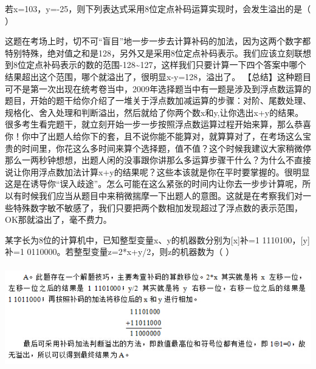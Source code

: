 \question 若x=103，y=-25，则下列表达式采用8位定点补码运算实现时，会发生溢出的是（
）
\par{}
\begin{solution}这题在考场上时，切不可``盲目''地一步一步去计算补码的加法，因为这两个数字都特别特殊，绝对值之和是128，另外又是采用8位定点补码表示。我们应该立刻联想到8位定点补码表示的数的范围-128\textasciitilde{}127，这样我们只要计算一下四个答案中哪个结果超出这个范围，哪个就溢出了，很明显x-y=128，溢出了。
【总结】这种题目可不是第一次出现在统考卷当中，2009年选择题当中有一题是涉及到浮点数运算的题目，开始的题干给你介绍了一堆关于浮点数加减运算的步骤：对阶、尾数处理、规格化、舍入处理和判断溢出，然后就给了你两个数x和y,让你选出x+y的结果。很多考生看完题干，就立刻开始一步一步按照浮点数运算过程开始来算，那么恭喜你！你中了出题人给你下的套，且不说你能不能算对，就算算对了，在考场这么宝贵的时间里，你花这么多时间来算个选择题，值不值？这个时候我建议大家稍微停那么一两秒钟想想，出题人闲的没事跟你讲那么多运算步骤干什么？为什么不直接说让你用浮点数加法计算x+y的结果呢？这些本该就是你在平时要掌握的。很明显这是在诱导你``误入歧途''。怎么可能在这么紧张的时间内让你去一步步计算呢，所以有时候我们应当从题目中来稍微揣摩一下出题人的意图。这就是在考察我们对一些特殊数字敏不敏感了，我们只要把两个数相加发现超过了浮点数的表示范围，OK那就溢出了，毫不费力。
\end{solution}
\question 某字长为8位的计算机中，已知整型变量x、y的机器数分别为{[}x{]}补=1
1110100，{[}y{]}补=1 0110000。若整型变量z=2*x+y/2，则z的机器数为（ ）
\par{}
\begin{solution}\includegraphics[width=5.73958in,height=1.75000in]{computerassets/f7aa3d33b4082cc7a9bf16eae72bd2a3.jpeg}
\end{solution}
